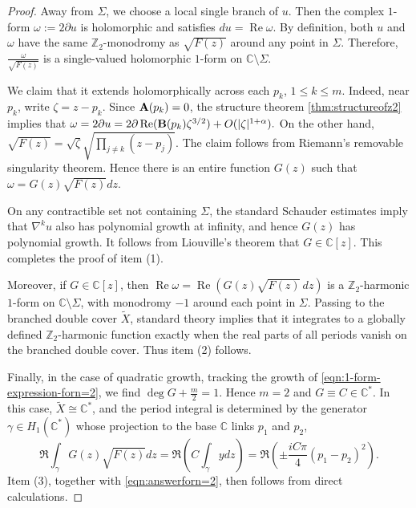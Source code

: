 \documentclass[11pt,a4paper]{article}
\numberwithin{equation}{section}%
\theoremstyle{definition}
\newcommand{\C}{\mathbb{C}}
\newcommand{\Z}{\mathbb{Z}}
\begin{document}
\begin{proof}
    Away from $\Sigma$, we choose a local single branch of $u$. Then the complex $1$-form $\omega:=2\partial u $
    is holomorphic and satisfies $du=\operatorname{Re}\omega$. By definition, both $u$ and $\omega$ have the same $\Z_2$-monodromy as $\sqrt{F(z)}$ around any point in $\Sigma$. Therefore, $\frac{\omega}{\sqrt{F(z)}}$
    is a single-valued holomorphic $1$-form on $\C\setminus\Sigma$.
    
    We claim that it extends holomorphically across each $p_k$, $1\leqslant k\leqslant m$. Indeed, near $p_k$, write $\zeta=z-p_k$. Since ${\bf A}(p_k)=0$, the structure theorem \ref{thm:structureofz2} implies that
    $
        \omega=2\partial u=2\partial\operatorname{Re}({\bf{B}}(p_k)\zeta^{3/2})+O(|\zeta|^{1+\alpha}).
    $
     On the other hand, $\sqrt{F(z)}=\sqrt{\zeta}\sqrt{\prod\limits_{j\neq k}(z-p_j)}$. 
     The claim follows from Riemann's removable singularity theorem. Hence there is an entire function $G(z)$ such that
    $\omega=G(z)\sqrt{F(z)}dz.$
    
    On any contractible set not containing $\Sigma$, the standard Schauder estimates imply that $\nabla^ku$ also has polynomial growth at infinity, and hence $G(z)$ has polynomial growth. It follows from Liouville's theorem that $G\in \C[z]$. This completes the proof of item (1). 
    
    Moreover, if $G\in\C[z]$, then $\operatorname{Re}\omega=\operatorname{Re}\left(G(z)\sqrt{F(z)}\,dz\right)$ is a  $\Z_2$-harmonic $1$-form on $\C\setminus\Sigma$, with monodromy $-1$ around each point in $\Sigma$. Passing to the branched double cover $\widetilde{X}$, standard theory implies that it integrates to a globally defined $\Z_2$-harmonic function exactly when the real parts of all periods vanish on the branched double cover. Thus item (2) follows. 

    Finally, in the case of quadratic growth, tracking the growth of \eqref{eqn:1-form-expression-forn=2}, we find $\deg G+\frac{m}{2}=1$. Hence $m=2$ and $G\equiv C\in \C^*$. In this case, $\widetilde{X}\cong \C^*$, and the period integral is determined by the generator $\gamma\in H_1(\C^*)$ whose projection to the base $\C$ links $p_1$ and $p_2$,
    $$\Re\int_{\gamma}G(z)\sqrt{F(z)}dz=\Re \left(C\int_\gamma ydz\right)=\Re\left(\pm \frac{iC\pi}{4}(p_1-p_2)^2 \right).$$
    Item (3), together with \eqref{eqn:answerforn=2}, then follows from direct calculations.
\end{proof}
\end{document}
